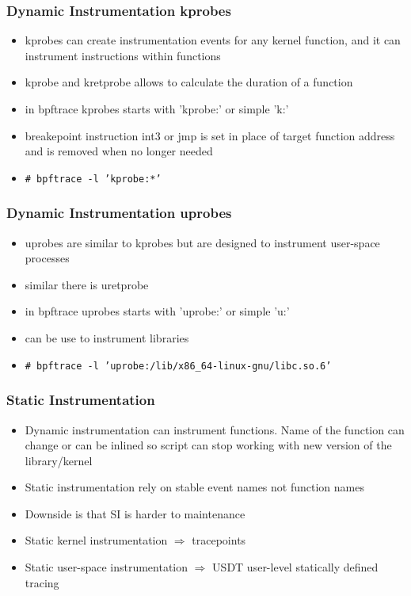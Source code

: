 \documentclass{beamer}
\begin{document}
\begin{frame}
  \frametitle{Dynamic Instrumentation kprobes}
  \begin{itemize}
    \item<1-> kprobes can create instrumentation events for any kernel function, and it can instrument instructions within functions

		\item<2-> kprobe and kretprobe allows to calculate the duration of a function 
		\item<3-> in bpftrace kprobes starts with 'kprobe:' or simple 'k:'
    \item<4-> breakepoint instruction int3 or jmp is set in place of target function address and is removed when no longer needed
    \item<5-> {\scriptsize \texttt{\# bpftrace -l 'kprobe:*'}}
	\end{itemize}	
\end{frame}

\begin{frame}
  \frametitle{Dynamic Instrumentation uprobes}
  \begin{itemize}
    \item<1-> uprobes are similar to kprobes but are designed to instrument user-space processes
		\item<2-> similar there is uretprobe
		\item<3-> in bpftrace uprobes starts with 'uprobe:' or simple 'u:'
		\item<4-> can be use to instrument libraries
    \item<5-> {\scriptsize \texttt{\# bpftrace -l 'uprobe:/lib/x86\_64-linux-gnu/libc.so.6' }}
	\end{itemize}	
\end{frame}

\begin{frame}
  \frametitle{Static Instrumentation}
	\begin{itemize}
	  \item<1-> Dynamic instrumentation can instrument functions. Name of the function can change or can be inlined so script can stop working with new version of the library/kernel
		\item<2-> Static instrumentation rely on stable event names not function names
		\item<3-> Downside is that SI is harder to maintenance
		\item<4-> Static kernel instrumentation $\Rightarrow$ tracepoints
		\item<5-> Static user-space instrumentation $\Rightarrow$ USDT user-level statically defined tracing
	\end{itemize}
\end{frame}
\end{document}

